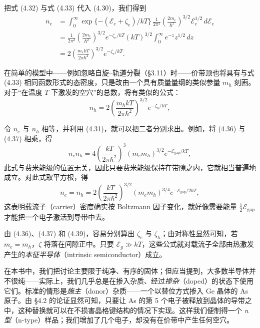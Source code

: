 把式 (4.32) 与式 (4.33) 代入 (4.30)，我们得到
\begin{align*}
n_e &= \int_0^{\infty} \exp\{-(\mathcal{E}_e+\zeta_e)/kT\}\,\frac{1}{2\pi^2}\left(\frac{2m_e}{\hbar^2}\right)^{3/2}\mathcal{E}_e^{1/2}\,d\mathcal{E}_e \\
&= \frac{1}{2\pi^2}\left(\frac{2m_e}{\hbar^2}\right)^{3/2} e^{-\zeta_e/kT}(kT)^{3/2}\int_0^{\infty} e^{-z}z^{1/2}\,dz \\
&= 2\left(\frac{m_e kT}{2\pi\hbar^2}\right)^{3/2} e^{-\zeta_e/kT}.
\tag{4.36}
\end{align*}

在简单的模型中——例如忽略自旋–轨道分裂（§3.11）时——价带顶也将具有与式 (4.33) 相同函数形式的态密度，只是改由一个具有质量量纲的类似参量 $m_h$ 刻画。对于“在温度 $T$ 下激发的空穴”的总数，将有类似的公式：
\begin{equation*}
n_h = 2\left(\frac{m_h kT}{2\pi\hbar^2}\right)^{3/2} e^{-\zeta_h/kT},
\tag{4.37}
\end{equation*}

令 $n_e$ 与 $n_h$ 相等，并利用 (4.31)，就可以把二者分别求出。例如，将 (4.36) 与 (4.37) 相乘，得
\begin{equation*}
n_e n_h = 4\left(\frac{kT}{2\pi\hbar^2}\right)^3 (m_e m_h)^{3/2} e^{-\mathcal{E}_{\mathrm{gap}}/kT},
\tag{4.38}
\end{equation*}
此式与费米能级的位置无关，因此只要费米能级保持在带隙之内，它就相当普遍地成立。对此式取平方根，得
\begin{equation*}
n_e = n_h = 2\left(\frac{kT}{2\pi\hbar^2}\right)^{3/2}(m_e m_h)^{3/4} e^{-\mathcal{E}_{\mathrm{gap}}/2kT},
\tag{4.39}
\end{equation*}
这表明载流子（carrier）密度确实按 Boltzmann 因子变化，就好像需要能量 $\frac{1}{2}\mathcal{E}_{\mathrm{gap}}$ 才能把一个电子激活到导带中去。

由 (4.36)、(4.37) 和 (4.39)，容易分别算出 $\zeta_e$ 与 $\zeta_h$；由对称性显然可知，若 $m_e=m_h$，$\zeta$ 将落在间隙正中。只要 $\mathcal{E}_g\gg kT$，这些公式就对载流子全部由热激发产生的\emph{本征半导体}（intrinsic semiconductor）成立。

在本书中，我们把讨论主要限于纯净、有序的固体；但应当提到，大多数半导体并不很纯——实际上，我们几乎总是在掺入杂质、经过\emph{掺杂}（doped）的状态下使用它们。标准的情形是\emph{施主}（donor）杂质——一个以替位方式掺入 Ge 晶体的 As 原子。由 §4.2 的论证显然可知，只要让 As 的第 5 个电子被释放到晶体的导带之中，这种替换就可以在不损害晶格键结构的情况下实现。这样我们便制得一个 \emph{n 型}（n-type）样品；我们增加了几个电子，却没有在价带中产生任何空穴。

